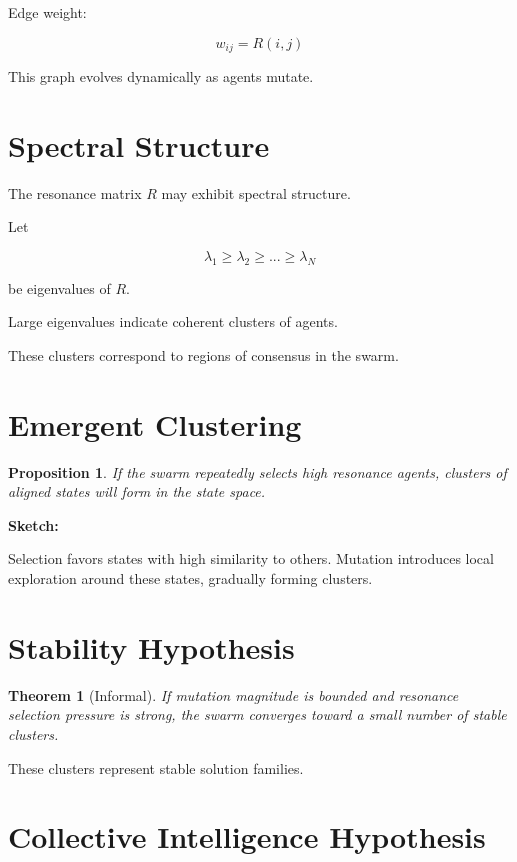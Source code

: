 \documentclass[11pt]{article}
\newtheorem{theorem}{Theorem}
\newtheorem{proposition}{Proposition}
\begin{document}
Edge weight:

\[
w_{ij} = R(i,j)
\]

This graph evolves dynamically as agents mutate.

\section{Spectral Structure}

The resonance matrix \(R\) may exhibit spectral structure.

Let

\[
\lambda_1 \ge \lambda_2 \ge ... \ge \lambda_N
\]

be eigenvalues of \(R\).

Large eigenvalues indicate coherent clusters of agents.

These clusters correspond to regions of consensus in the swarm.

\section{Emergent Clustering}

\begin{proposition}

If the swarm repeatedly selects high resonance agents, clusters of aligned states will form in the state space.

\end{proposition}

\textbf{Sketch:}

Selection favors states with high similarity to others. Mutation introduces local exploration around these states, gradually forming clusters.

\section{Stability Hypothesis}

\begin{theorem}[Informal]

If mutation magnitude is bounded and resonance selection pressure is strong, the swarm converges toward a small number of stable clusters.

\end{theorem}

These clusters represent stable solution families.

\section{Collective Intelligence Hypothesis}
\end{document}
